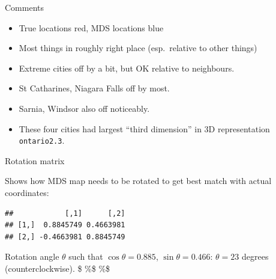\documentclass[ignorenonframetext,]{beamer}
\newenvironment{Shaded}{\begin{snugshade}}{\end{snugshade}}
\newcommand{\NormalTok}[1]{#1}
\newcommand{\OperatorTok}[1]{\textcolor[rgb]{0.81,0.36,0.00}{\textbf{#1}}}
\begin{document}
\begin{frame}[fragile]{Comments}
\protect\hypertarget{comments-24}{}

\begin{itemize}
\item
  True locations red, MDS locations blue
\item
  Most things in roughly right place (esp.~relative to other things)
\item
  Extreme cities off by a bit, but OK relative to neighbours.
\item
  St Catharines, Niagara Falls off by most.
\item
  Sarnia, Windsor also off noticeably.
\item
  These four cities had largest ``third dimension'' in 3D representation
  \texttt{ontario2.3}.
\end{itemize}

\end{frame}

\begin{frame}[fragile]{Rotation matrix}
\protect\hypertarget{rotation-matrix}{}

Shows how MDS map needs to be rotated to get best match with actual
coordinates:

\begin{Shaded}
\end{Shaded}

\begin{verbatim}
##            [,1]      [,2]
## [1,]  0.8845749 0.4663981
## [2,] -0.4663981 0.8845749
\end{verbatim}

Rotation angle \(\theta\) such that \(\cos\theta=0.885\),
\(\sin\theta=0.466\): \(\theta=23\) degrees (counterclockwise). \$ \%\$
\%\$

\end{frame}
\end{document}

